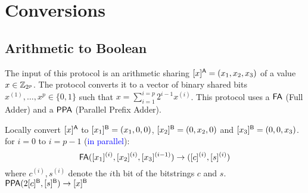 \section{Conversions}

\subsection{Arithmetic to Boolean}
\begin{algorithm}[H]
\renewcommand{\thealgorithm}{}
\caption{$[x]^\Arithmetic \rightarrow [\vec{x}]^\Boolean$}
\label{protocol1}
The input of this protocol is an arithmetic sharing $[x]^{\mathsf{A}} = (x_1, x_2, x_3)$ of a value $x \in \mathbb{Z}_{2^p}$. The protocol converts it to a vector of binary shared bits $x^{(1)}, \ldots, x^{p} \in \{0, 1\}$ such that $x = \sum_{i = 1}^{i = p} 2^{i - 1} x^{(i)}$. This protocol uses a $\mathsf{FA}$ (Full Adder) and a $\mathsf{PPA}$ (Parallel Prefix Adder).
\bigskip
\begin{algorithmic}[1]
\STATE Locally convert $[x]^{\mathsf{A}}$ to $[x_1]^{\mathsf{B}} = (x_1, 0, 0)$, $[x_2]^{\mathsf{B}} = (0, x_2, 0)$ and $[x_3]^{\mathsf{B}} = (0, 0, x_3)$.
\STATE for $i = 0$ to $i = p - 1$ (\textcolor{blue}{in parallel}):
\begin{equation*}
    \mathsf{FA}([x_1]^{(i)}, [x_2]^{(i)}, [x_3]^{(i - 1)}) \rightarrow ([c]^{(i)}, [s]^{(i)})
\end{equation*} 
where $c^{(i)}, s^{(i)}$ denote the $i$th bit of the bitstrings $c$ and $s$.
\medskip
\STATE $\mathsf{PPA}(2[c]^{\mathsf{B}}, [s]^{\mathsf{B}}) \rightarrow [x]^{\mathsf{B}}$ 
\end{algorithmic}
\end{algorithm}


